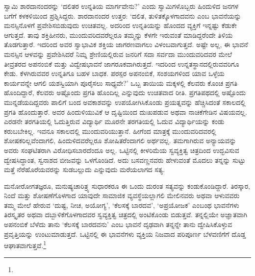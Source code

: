 ಸ್ವಾಮಿ ಶಾರದಾನಂದರನ್ನು ‘ದಲಿತರ ಉನ್ನತಿಯ ಮಾರ್ಗವೇನು?’ ಎಂದು ಸ್ವಾಮಿ\-ಗಳೊ\-ಬ್ಬರು ಹಿಂದುಳಿದ ಜನಗಳ ಬಗೆಗೆ ಕಳಕಳಿಯಿಂದ ಪ್ರಶ್ನಿಸಿದ್ದರು. ಶಾರದಾನಂದರ ಉತ್ತರ: ‘ದಲಿತ, ತುಳಿತಕ್ಕೊಳಗಾದವನು ಎಂಬ ಭಾವನೆಯನ್ನು ಮನಸ್ಸಿನೊಳಗೆ ಪ್ರವೇಶಿಸಬಿಡುವುದು ಉಚಿತವಲ್ಲ. ಅದರಿಂದ ಉನ್ನತಿಯನ್ನು ಹೊಂದದ ವ್ಯಕ್ತಿಗೆ ಇನ್ನಷ್ಟು ಕೆಡುಕೇ ಆಗುತ್ತದೆ. ತಾವು ಶಕ್ತಿಹೀನರು, ಮುಂದುವರಿದವರೆಲ್ಲರೂ ತಮ್ಮನ್ನು ಕೆಳಗೇ ಇರುವಂತೆ ಮಾಡಿದ್ದರೆಂದೇ ತಿಳಿಯ ತೊಡಗುತ್ತಾರೆ. ಇದರಿಂದ ಅವರ ಸ್ವಾಭಾವಿಕ ಶಕ್ತಿಯ ಜಾಗರಣವಾಗಲು ವಿಳಂಬವಾಗುತ್ತದೆ. ಅಷ್ಟೇ ಅಲ್ಲ, ಈ ಭಾವನೆ ಮನಸ್ಸಿನ ಆಳವನ್ನು ಪ್ರವೇಶಿಸಿದರೆ ನಿಮ್ನ ಶ್ರೇಣಿಯಲ್ಲಿರುವ ಜನರಿಗೆ ಸದಾ ಸರ್ವದಾ ಮುಂದುವರಿದವರ ಮೇಲೆ ತೀವ್ರತರದ ಅಪನಂಬಿಕೆ ಮತ್ತು ವಿದ್ವೇಷಭಾವನೆ ಜಾಗರೂಕವಾಗಿರುತ್ತದೆ. ಇದರಿಂದ ಉನ್ನತಸ್ಥಾನದಲ್ಲಿರುವವರಿಗೂ ಕೇಡು. ಕೆಳಗಿರುವವರ ಉನ್ನತಿಗೂ ಬಹಳ ಬಾಧಕ. ಪರಸ್ಪರ ಅಪನಂಬಿಕೆ, ಸಂಶಯಗಳಿಂದ ಯಾವ ಒಳ್ಳೆಯ ಕಾರ್ಯವನ್ನೇ ಆಗಲಿ ಯಶಸ್ವಿಯಾಗಿ ಪೂರೈಸಲು ಸಾಧ್ಯವೇ?’ ಒಬ್ಬ ತಾಯಿಯ ಮಕ್ಕಳಲ್ಲಿ ಕೆಲವರು ಕೊಂಚ ಪ್ರಗತಿ ಹೊಂದಿದ್ದಾರೆ, ಕೆಲವರು ಅಷ್ಟೊಂದು ಪ್ರಗತಿ ಹೊಂದಿಲ್ಲ ಎನ್ನುವುದು ಉಚಿತವಾದ ರೀತಿ. ಪ್ರಗತಿಪಥದಲ್ಲಿ ಅಷ್ಟೊಂದು ಮುನ್ನಡೆಯದಿದ್ದವರು ಪಾಲಿಗೆ ಬಂದ ಅವಕಾಶವನ್ನು ಉಪಯೋಗಿಸಿಕೊಂಡು ಪ್ರಯತ್ನವನ್ನು ಹೆಚ್ಚಿಸಿದಂತೆ ಸಕಾಲದಲ್ಲಿ ಪ್ರಗತಿ ಹೊಂದುತ್ತಾರೆ. ಅವರ ಹಿಂದುಳಿಯುವಿಕೆ ಆ ದೃಷ್ಟಿಯಿಂದ ದುಃಖಪಡುವ ಅಥವಾ ನಾಚಿಕೆಗೇಡಿನ ವಿಷಯವಲ್ಲ. ಎರಡನೇ ತರಗತಿಯಲ್ಲಿ ಓದುತ್ತಿರುವ ವಿದ್ಯಾರ್ಥಿ ಮೂರನೇ ತರಗತಿಯಲ್ಲಿ ಓದುವ ವಿದ್ಯಾರ್ಥಿಯನ್ನು ಕಂಡು ಕರುಬಬೇಕಿಲ್ಲ. ಇವನೂ ಸಕಾಲದಲ್ಲಿ ಮುಂದುವರಿಯುತ್ತಾನೆ. ಹೀಗೆಂದ ಮಾತ್ರಕ್ಕೆ ಮುಂದು\-ವರಿದವರಲ್ಲಿ ಶೋಷಕರಿಲ್ಲವೆಂದಾಗಲಿ, ಹಿಂದುಳಿದವರೆಲ್ಲರೂ ಶೋಷಿತರೆಂದಾಗಲಿ ಅರ್ಥವಲ್ಲ. ತಮಗಾಗಿರುವ ಅನ್ಯಾಯವನ್ನು ಅವರು ಸಂಘಟಿತರಾಗಿ ವಿರೋಧಿಸಬಾರದೆಂದೂ ಅಲ್ಲ. ಒಟ್ಟಿನಲ್ಲಿ ಕೀಳರಿಮೆಯ ಸ್ವವ್ಯಕ್ತಿತ್ವ ಚಿತ್ರದಿಂದ ಉದ್ಭವಿಸುವ ದ್ವೇಷಸಿದ್ಧಾಂತ, ಸ್ವನಾಶದ ಬೀಜವನ್ನು ಒಳಗೊಂಡಿದೆ. ಅದು ಬಸವಣ್ಣನವರು ಹೇಳುವಂತೆ ಮೊದಲು ತನ್ನನ್ನು ಸುಟ್ಟು ಮತ್ತೆ ನೆರೆಹೊರೆ\-ಯವರನ್ನು ಸುಡಬಲ್ಲುದು ಎನ್ನುವುದು ಮರೆಯಲಾಗದ ಸತ್ಯ.

ಮನೋರೋಗತಜ್ಞರೂ, ಮನುಷ್ಯಚಾರಿತ್ರ್ಯ ಸುಧಾರಕರೂ ಈ ಒಂದು ದುರಂತ ಸತ್ಯವನ್ನು ಕಂಡುಕೊಂಡಿದ್ದಾರೆ. ತಿರಸ್ಕಾರ, ನಿಂದೆ ಮತ್ತು ಶೋಷಣೆಗೊಳಗಾದ ಯಾವುದೇ ಸಾಮಾಜಿಕ ವ್ಯವಸ್ಥೆಯಲ್ಲಾಗಲಿ ಮೇಲಿನವರು ಅಥವಾ ಆಳುವವರು ತಮ್ಮ ಮೇಲೆ ಹೇರುವ ‘ದುಷ್ಟ, ನೀಚ, ಅಯೋಗ್ಯ’, ‘ಕೆಲಸಕ್ಕೆ ಬಾರದವ’, ‘ಅಪ್ರಯೋಜಕ’ ಎಂಬಂಥ ಭಾವನೆಗಳು ತಿರಸ್ಕೃತರ ಅಥವಾ ದಬ್ಬಾಳಿಕೆಗೊಳಗಾದವರ ಸ್ವವ್ಯಕ್ತಿತ್ವ ಚಿತ್ರದಲ್ಲಿ ಅಂಟಿಕೊಂಡು ಬಿಡುತ್ತವೆ. ತನ್ನಲ್ಲಿಯೇ ಅಜ್ಞಾತವಾಗಿ ಅಪನಂಬಿಕೆ ಬೆಳೆದು ತಾನು ‘ಕೆಲಸಕ್ಕೆ ಬಾರದವನು’ ಎಂಬ ಭಾವನೆ ದೃಢವಾಗಿ ತನ್ನನ್ನೇ ತಾನು ದ್ವೇಷಿಸಿಕೊಳ್ಳುವ ಪ್ರವೃತ್ತಿಯನ್ನು ಉಂಟುಮಾಡುತ್ತದೆ. ಒಟ್ಟಿನಲ್ಲಿ ಈ ಭಾವನೆಗಳು ವ್ಯಕ್ತಿಯ ನಿಜವಾದ ಪರಿಪೂರ್ಣ ಬೆಳವಣಿಗೆಗೆ ದೊಡ್ಡ ಆಘಾತವಾಗುತ್ತವೆ.\footnote{

}

